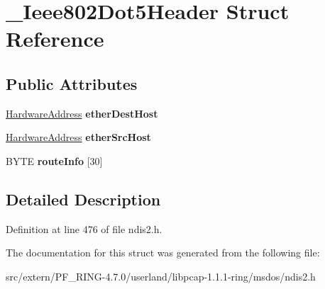 \hypertarget{struct___ieee802_dot5_header}{
\section{\_\-Ieee802Dot5Header Struct Reference}
\label{struct___ieee802_dot5_header}
}
\subsection*{Public Attributes}
\begin{DoxyCompactItemize}
\item 
\hypertarget{struct___ieee802_dot5_header_a9d720c6e86d39d06f5a699f923f6a3aa}{
\hyperlink{union___hardware_address}{HardwareAddress} {\bfseries etherDestHost}}
\label{struct___ieee802_dot5_header_a9d720c6e86d39d06f5a699f923f6a3aa}

\item 
\hypertarget{struct___ieee802_dot5_header_a731a8450eb9cf5859688a4a8eba3e2e7}{
\hyperlink{union___hardware_address}{HardwareAddress} {\bfseries etherSrcHost}}
\label{struct___ieee802_dot5_header_a731a8450eb9cf5859688a4a8eba3e2e7}

\item 
\hypertarget{struct___ieee802_dot5_header_a9b66b898ba9336659ac0287fa3e9b091}{
BYTE {\bfseries routeInfo} \mbox{[}30\mbox{]}}
\label{struct___ieee802_dot5_header_a9b66b898ba9336659ac0287fa3e9b091}

\end{DoxyCompactItemize}


\subsection{Detailed Description}


Definition at line 476 of file ndis2.h.



The documentation for this struct was generated from the following file:\begin{DoxyCompactItemize}
\item 
src/extern/PF\_\-RING-\/4.7.0/userland/libpcap-\/1.1.1-\/ring/msdos/ndis2.h\end{DoxyCompactItemize}
